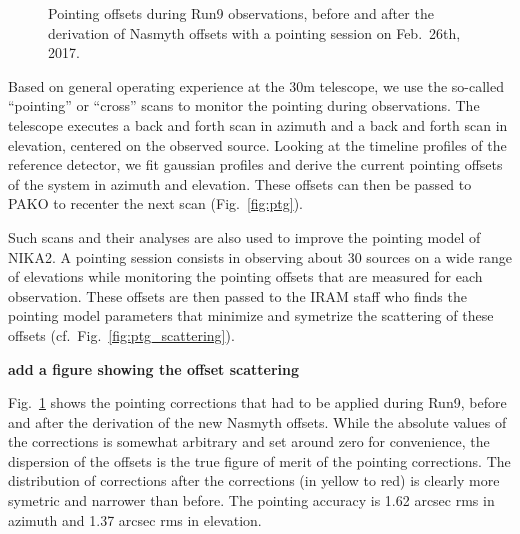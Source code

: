 \begin{figure}[p]
\begin{center}
\caption{Pointing offsets during Run9 observations, before and after the
  derivation of Nasmyth offsets with a pointing session on Feb.~26th, 2017.}
\label{fig:pointing_stats_n2r9}
\end{center}
\end{figure}

Based on general operating experience at the 30m telescope, we use the so-called
``pointing'' or ``cross'' scans to monitor the pointing during observations. The
telescope executes a back and forth scan in azimuth and a back and forth scan in
elevation, centered on the observed source. Looking at the timeline profiles of
the reference detector, we fit gaussian profiles and derive the current pointing
offsets of the system in azimuth and elevation. These offsets can then be passed
to PAKO to recenter the next scan (Fig.~\ref{fig:ptg}).

Such scans and their analyses are also used to improve the pointing model
of NIKA2. A pointing session consists in observing about 30 sources on a wide
range of elevations while monitoring the pointing offsets that are measured for
each observation. These offsets are then passed to the IRAM staff who finds
the pointing model parameters that minimize and symetrize the scattering of
these offsets
(cf.~Fig.~\ref{fig:ptg_scattering}).

{\bf add a figure showing the offset scattering}

Fig.~\ref{fig:pointing_stats_n2r9} shows
the pointing corrections that had to be applied during Run9, before and after
the derivation of the new Nasmyth offsets. While the absolute values of the
corrections is somewhat arbitrary and set around zero for convenience, the
dispersion of the offsets is the true figure of merit of the pointing
corrections. The distribution of corrections after the corrections (in yellow to
red) is clearly more symetric and narrower than before. The pointing accuracy is
1.62 arcsec rms in azimuth and 1.37 arcsec rms in elevation.
